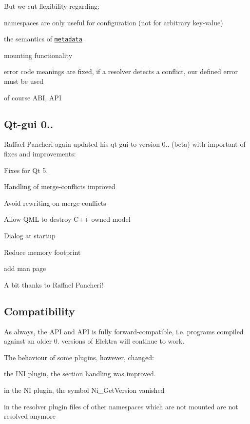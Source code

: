 But we cut flexibility regarding\+:


\begin{DoxyItemize}
\item namespaces are only useful for configuration (not for arbitrary key-\/value)
\item the semantics of \href{https://git.libelektra.org/blob/master/doc/METADATA.ini}{\tt metadata}
\item mounting functionality
\item error code meanings are fixed, if a resolver detects a conflict, our defined error must be used
\item of course A\+BI, A\+PI
\end{DoxyItemize}

\subsection*{Qt-\/gui 0..}

Raffael Pancheri again updated his qt-\/gui to version 0.. (beta) with important of fixes and improvements\+:


\begin{DoxyItemize}
\item Fixes for Qt 5.
\item Handling of merge-\/conflicts improved
\item Avoid rewriting on merge-\/conflicts
\item Allow Q\+ML to destroy C++ owned model
\item Dialog at startup
\item Reduce memory footprint
\item add man page
\end{DoxyItemize}

A bit thanks to Raffael Pancheri!

\subsection*{Compatibility}

As always, the A\+PI and A\+PI is fully forward-\/compatible, i.\+e. programs compiled against an older 0. versions of Elektra will continue to work.

The behaviour of some plugins, however, changed\+:


\begin{DoxyItemize}
\item the I\+NI plugin, the section handling was improved.
\item in the NI plugin, the symbol Ni\+\_\+\+Get\+Version vanished
\item in the resolver plugin files of other namespaces which are not mounted are not resolved anymore
\end{DoxyItemize}


